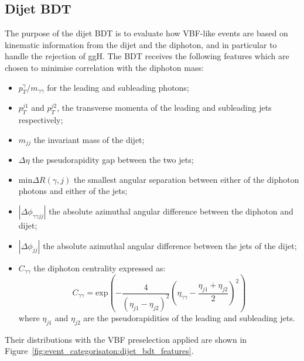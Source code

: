 \subsection{Dijet BDT}
The purpose of the dijet BDT is to evaluate how VBF-like events are based on kinematic information from the dijet and the diphoton, and in particular to handle the rejection of ggH.
The BDT receives the following features which are chosen to minimise correlation with the diphoton mass:
\begin{itemize}[noitemsep]
    \item $p^{\gamma}_{T}/m_{\gamma\gamma}$ for the leading and subleading photons;
    \item $p_{T}^{j1}$ and $p_{T}^{j2}$, the transverse momenta of the leading and subleading jets respectively;
    \item $m_{jj}$ the invariant mass of the dijet;
    \item $\Delta\eta$ the pseudorapidity gap between the two jets;
    \item $\mathrm{min}\Delta{R}(\gamma,j)$ the smallest angular separation between either of the diphoton photons and either of the jets;
    \item $|\Delta\phi_{\gamma\gamma{jj}}|$ the absolute azimuthal angular difference between the diphoton and dijet;
    \item $|\Delta\phi_{jj}|$ the absolute azimuthal angular difference between the jets of the dijet;
    \item $C_{\gamma\gamma}$ the diphoton centrality expressed as:
        \begin{equation}
            C_{\gamma\gamma} = \mathrm{exp}\left(-\frac{4}{(\eta_{j1} - \eta_{j2})^{2}}\left( \eta_{\gamma\gamma} - \frac{\eta_{j1} + \eta_{j2}}{2} \right)^{2}\right)
        \end{equation}
        where $\eta_{j1}$ and $\eta_{j2}$ are the pseudorapidities of the leading and subleading jets.
\end{itemize}
Their distributions with the VBF preselection applied are shown in Figure~\ref{fig:event_categorisaton:dijet_bdt_features}.


